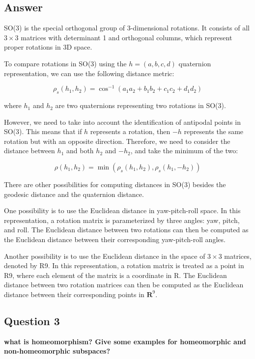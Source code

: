 \documentclass[12]{article}
\begin{document}
\subsection*{Answer}

SO(3) is the special orthogonal group of 3-dimensional rotations. It consists of all $3\times3$ matrices with determinant 1 and orthogonal columns, which represent proper rotations in 3D space.

To compare rotations in SO(3) using the $h=(a,b,c,d)$ quaternion representation, we can use the following distance metric:

\begin{equation*}
\rho_s(h_1, h_2) = \cos^{-1}(a_1a_2 + b_1b_2 + c_1c_2 + d_1d_2)
\end{equation*}

where $h_1$ and $h_2$ are two quaternions representing two rotations in SO(3).

However, we need to take into account the identification of antipodal points in SO(3). This means that if $h$ represents a rotation, then $-h$ represents the same rotation but with an opposite direction. Therefore, we need to consider the distance between $h_1$ and both $h_2$ and $-h_2$, and take the minimum of the two:

\begin{equation*}
\rho(h_1, h_2) = \min(\rho_s(h_1, h_2), \rho_s(h_1, -h_2))
\end{equation*}

There are other possibilities for computing distances in SO(3) besides the geodesic distance and the quaternion distance.

One possibility is to use the Euclidean distance in yaw-pitch-roll space. In this representation, a rotation matrix is parameterized by three angles: yaw, pitch, and roll. The Euclidean distance between two rotations can then be computed as the Euclidean distance between their corresponding yaw-pitch-roll angles.

Another possibility is to use the Euclidean distance in the space of $3\times3$ matrices, denoted by R9. In this representation, a rotation matrix is treated as a point in R9, where each element of the matrix is a coordinate in R. The Euclidean distance between two rotation matrices can then be computed as the Euclidean distance between their corresponding points in $\mathbf{R}^9$.


\subsection*{\textbf{Question 3}}
\textbf{what is homeomorphism? Give some examples for homeomorphic and non-homeomorphic subspaces?}
\end{document}
